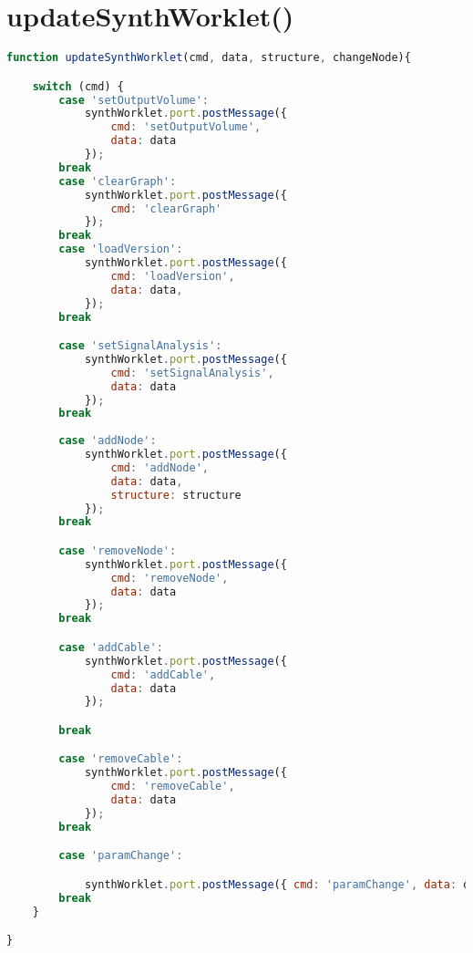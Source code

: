\section{updateSynthWorklet()}

\begin{lstlisting}[language=JavaScript, caption={Sends commands from the UI to the synthWorklet audio engine via the Web Audio API’s message port. Supports graph updates (e.g., adding/removing nodes or cables), parameter changes, and signal analysis configuration. Commands are structured and dispatched using a switch statement.}, label={lst:updateSynthWorklet-function}]
function updateSynthWorklet(cmd, data, structure, changeNode){

    switch (cmd) {
        case 'setOutputVolume':
            synthWorklet.port.postMessage({ 
                cmd: 'setOutputVolume',
                data: data
            });
        break
        case 'clearGraph':
            synthWorklet.port.postMessage({ 
                cmd: 'clearGraph'
            });
        break
        case 'loadVersion':
            synthWorklet.port.postMessage({ 
                cmd: 'loadVersion', 
                data: data,
            });
        break

        case 'setSignalAnalysis':
            synthWorklet.port.postMessage({ 
                cmd: 'setSignalAnalysis', 
                data: data
            });
        break
        
        case 'addNode':
            synthWorklet.port.postMessage({ 
                cmd: 'addNode', 
                data: data,
                structure: structure
            });
        break

        case 'removeNode':
            synthWorklet.port.postMessage({ 
                cmd: 'removeNode', 
                data: data
            });
        break

        case 'addCable':
            synthWorklet.port.postMessage({
                cmd: 'addCable',
                data: data
            });

        break

        case 'removeCable':
            synthWorklet.port.postMessage({
                cmd: 'removeCable',
                data: data
            });
        break

        case 'paramChange':

            synthWorklet.port.postMessage({ cmd: 'paramChange', data: data });
        break
    }

}
\end{lstlisting}

